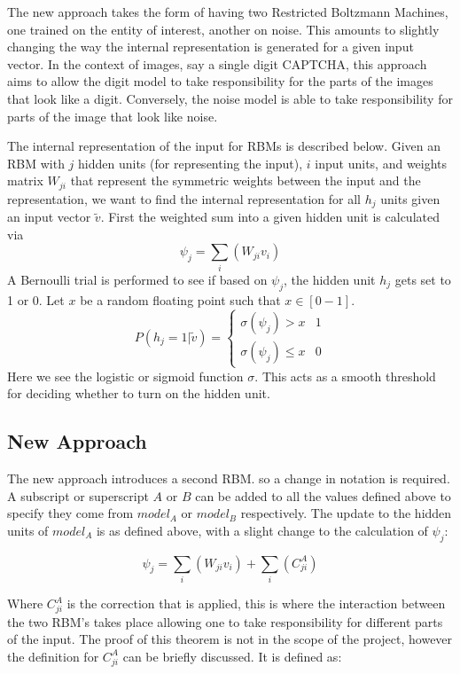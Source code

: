 The new approach takes the form of having two Restricted Boltzmann Machines, one trained on the entity of interest, another on noise.
This amounts to slightly changing the way the internal representation is generated for a given input vector. In the context of images, say a single digit CAPTCHA, this approach aims to allow the digit model to take responsibility for the parts of the images that look like a digit. Conversely, the noise model is able to take responsibility for parts of the image that look like noise.

The internal representation of the input for RBMs is described below.
Given an RBM with $j$ hidden units (for representing the input), $i$ input units, and weights matrix $W_{ji}$ that represent the symmetric weights between the input and the representation, we want to find the internal representation for all $ h_j $ units given an input vector $ \tilde{v} $.
First the weighted sum into a given hidden unit is calculated via
$$ \psi_j = \sum_i ( W_{ji}v_i ) $$
A Bernoulli trial is performed to see if based on $ \psi_j $, the hidden unit $ h_j $ gets set to 1 or 0.
Let $ x  $ be a random floating point such that $ x \in [0-1] $.
$$ P(h_j = 1 | \tilde{v}) =
\begin{cases}
  \sigma(\psi_j) > x & 1 \\
  \sigma(\psi_j) \leq x & 0
\end{cases} $$
Here we see the logistic or sigmoid function $\sigma$. This acts as a smooth threshold for deciding whether to turn on the hidden unit.

\subsection{New Approach}

The new approach introduces a second RBM. so a change in notation is required. A subscript or superscript $A$ or $B$ can be added to all the values defined above to specify they come from $model_A$ or $model_B$ respectively. The update to the hidden units of $model_A$ is as defined above, with a slight change to the calculation of $\psi_j$:

$$ \psi_j = \sum_i ( W_{ji}v_i ) + \sum_i (C^A_{ji}) $$

Where $ C^A_{ji} $ is the correction that is applied, this is where the interaction between the two RBM's takes place allowing one to take responsibility for different parts of the input.
The proof of this theorem is not in the scope of the project, however the definition for $ C^A_{ji} $ can be briefly discussed. It is defined as:

